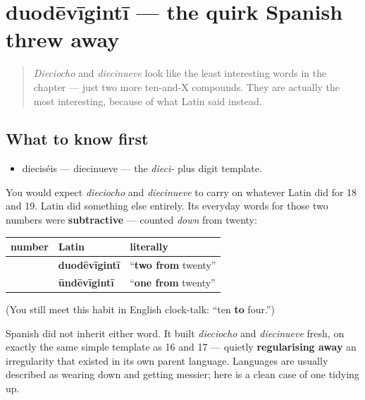 \section[duodēvīgintī, ūndēvīgintī]{duodēvīgintī — the quirk Spanish threw away}

\label{lesson:ES-C31-teens-latinos}



\begin{quote}
\emph{Dieciocho} and \emph{diecinueve} look like the least interesting words in the chapter — just two more ten-and-X compounds. They are actually the most interesting, because of what Latin said instead.
\end{quote}

\subsection*{What to know first}
\begin{itemize}
\raggedright
  \item dieciséis — diecinueve — the \emph{dieci-} plus digit template.
\end{itemize}

\begin{culture}
You would expect \emph{dieciocho} and \emph{diecinueve} to carry on whatever Latin did for 18 and 19. Latin did something else entirely. Its everyday words for those two numbers were \textbf{subtractive} — counted \emph{down} from twenty:

\noindent
\begin{tabularx}{\linewidth}{@{}>{\raggedright\arraybackslash}X>{\raggedright\arraybackslash}X>{\raggedright\arraybackslash}X@{}}
\toprule
\textbf{number} & \textbf{Latin} & \textbf{literally} \\
\midrule
18 & \textbf{duodēvīgintī} & \textquotedblleft{}\textbf{two from} twenty\textquotedblright{} \\
19 & \textbf{ūndēvīgintī} & \textquotedblleft{}\textbf{one from} twenty\textquotedblright{} \\
\bottomrule
\end{tabularx}

(You still meet this habit in English clock-talk: \textquotedblleft{}ten \textbf{to} four.\textquotedblright{})

Spanish did not inherit either word. It built \emph{dieciocho} and \emph{diecinueve} fresh, on exactly the same simple template as 16 and 17 — quietly \textbf{regularising away} an irregularity that existed in its own parent language. Languages are usually described as wearing down and getting messier; here is a clean case of one tidying up.
\end{culture}

